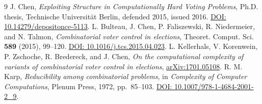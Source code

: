 \documentclass[11pt,a4paper]{amsart}
\begin{document}
\begin{thebibliography}{9}
J. Chen, \emph{Exploiting Structure in Computationally Hard Voting Problems}, Ph.D. thesis, Technische Universit\"at Berlin, defended 2015, issued 2016. \href{https://doi.org/10.14279/depositonce-5113}{DOI: 10.14279/depositonce-5113}.
L. Bulteau, J. Chen, P. Faliszewski, R. Niedermeier, and N. Talmon, \emph{Combinatorial voter control in elections}, Theoret. Comput. Sci. \textbf{589} (2015), 99--120. \href{https://doi.org/10.1016/j.tcs.2015.04.023}{DOI: 10.1016/j.tcs.2015.04.023}.
L. Kellerhals, V. Korenwein, P. Zschoche, R. Bredereck, and J. Chen, \emph{On the computational complexity of variants of combinatorial voter control in elections}, \href{https://arxiv.org/abs/1701.05108}{arXiv:1701.05108}.
R. M. Karp, \emph{Reducibility among combinatorial problems}, in \emph{Complexity of Computer Computations}, Plenum Press, 1972, pp.~85--103. \href{https://doi.org/10.1007/978-1-4684-2001-2_9}{DOI: 10.1007/978-1-4684-2001-2\_9}.
\end{thebibliography}
\end{document}
